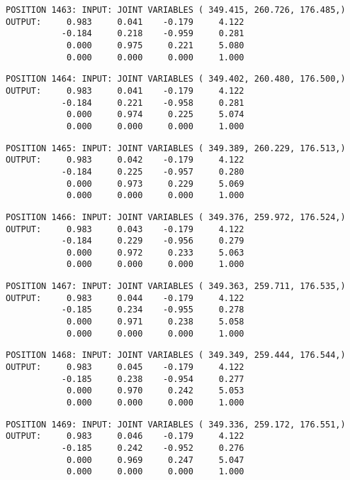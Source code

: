\begin{verbatim}
POSITION 1463: INPUT: JOINT VARIABLES ( 349.415, 260.726, 176.485,)
OUTPUT:     0.983     0.041    -0.179     4.122
           -0.184     0.218    -0.959     0.281
            0.000     0.975     0.221     5.080
            0.000     0.000     0.000     1.000
\end{verbatim} \pagebreak[1]\begin{verbatim}
POSITION 1464: INPUT: JOINT VARIABLES ( 349.402, 260.480, 176.500,)
OUTPUT:     0.983     0.041    -0.179     4.122
           -0.184     0.221    -0.958     0.281
            0.000     0.974     0.225     5.074
            0.000     0.000     0.000     1.000
\end{verbatim} \pagebreak[1]\begin{verbatim}
POSITION 1465: INPUT: JOINT VARIABLES ( 349.389, 260.229, 176.513,)
OUTPUT:     0.983     0.042    -0.179     4.122
           -0.184     0.225    -0.957     0.280
            0.000     0.973     0.229     5.069
            0.000     0.000     0.000     1.000
\end{verbatim} \pagebreak[1]\begin{verbatim}
POSITION 1466: INPUT: JOINT VARIABLES ( 349.376, 259.972, 176.524,)
OUTPUT:     0.983     0.043    -0.179     4.122
           -0.184     0.229    -0.956     0.279
            0.000     0.972     0.233     5.063
            0.000     0.000     0.000     1.000
\end{verbatim} \pagebreak[1]\begin{verbatim}
POSITION 1467: INPUT: JOINT VARIABLES ( 349.363, 259.711, 176.535,)
OUTPUT:     0.983     0.044    -0.179     4.122
           -0.185     0.234    -0.955     0.278
            0.000     0.971     0.238     5.058
            0.000     0.000     0.000     1.000
\end{verbatim} \pagebreak[1]\begin{verbatim}
POSITION 1468: INPUT: JOINT VARIABLES ( 349.349, 259.444, 176.544,)
OUTPUT:     0.983     0.045    -0.179     4.122
           -0.185     0.238    -0.954     0.277
            0.000     0.970     0.242     5.053
            0.000     0.000     0.000     1.000
\end{verbatim} \pagebreak[1]\begin{verbatim}
POSITION 1469: INPUT: JOINT VARIABLES ( 349.336, 259.172, 176.551,)
OUTPUT:     0.983     0.046    -0.179     4.122
           -0.185     0.242    -0.952     0.276
            0.000     0.969     0.247     5.047
            0.000     0.000     0.000     1.000
\end{verbatim} \pagebreak[1]\begin{verbatim}

\end{verbatim}
